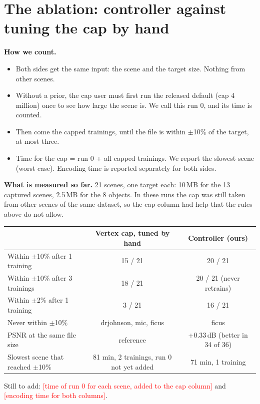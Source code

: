 \documentclass[10pt]{article}
\newcommand{\todo}[1]{\textcolor{red}{[#1]}}
\begin{document}
\section{The ablation: controller against tuning the cap by hand}
\textbf{How we count.}
\begin{itemize}
\item Both sides get the same input: the scene and the target size. Nothing from other scenes.
\item Without a prior, the cap user must first run the released default (cap 4 million) once to see how large the scene is. We call this run 0, and its time is counted.
\item Then come the capped trainings, until the file is within $\pm$10\% of the target, at most three.
\item Time for the cap = run 0 + all capped trainings. We report the slowest scene (worst case). Encoding time is reported separately for both sides.
\end{itemize}

\textbf{What is measured so far.} 21 scenes, one target each: 10\,MB for the 13 captured scenes, 2.5\,MB for the 8 objects. In these runs the cap was still taken from other scenes of the same dataset, so the cap column had help that the rules above do not allow.

\begin{table}[H]\centering\small
\begin{tabular}{@{}lcc@{}}
\toprule
 & Vertex cap, tuned by hand & Controller (ours) \\
\midrule
Within $\pm$10\% after 1 training & 15 / 21 & 20 / 21 \\
Within $\pm$10\% after 3 trainings & 18 / 21 & 20 / 21 (never retrains) \\
Within $\pm$2\% after 1 training & 3 / 21 & 16 / 21 \\
Never within $\pm$10\% & drjohnson, mic, ficus & ficus \\
PSNR at the same file size & reference & +0.33\,dB (better in 34 of 36) \\
Slowest scene that reached $\pm$10\% & 81 min, 2 trainings, run 0 not yet added & 71 min, 1 training \\
\bottomrule
\end{tabular}
\end{table}
\vspace{-4pt}
Still to add: \todo{time of run 0 for each scene, added to the cap column} and \todo{encoding time for both columns}.
\end{document}
